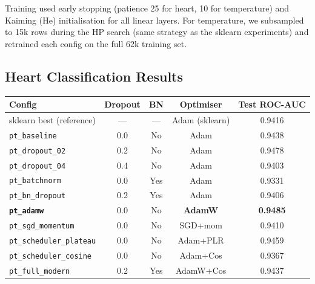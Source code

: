 \documentclass[11pt,a4paper]{article}
\begin{document}
Training used early stopping (patience 25 for heart, 10 for temperature) and Kaiming (He) initialisation for all linear layers.
For temperature, we subsampled to 15k rows during the HP search (same strategy as the sklearn experiments) and retrained each config on the full 62k training set.

\subsection{Heart Classification Results}

\begin{center}
\small
\begin{tabular}{lcccc}
\toprule
\textbf{Config} & \textbf{Dropout} & \textbf{BN} & \textbf{Optimiser} & \textbf{Test ROC-AUC} \\
\midrule
sklearn best (reference)           & ---  & ---  & Adam (sklearn) & 0.9416 \\
\midrule
\texttt{pt\_baseline}          & 0.0  & No  & Adam           & 0.9438 \\
\texttt{pt\_dropout\_02}       & 0.2  & No  & Adam           & 0.9478 \\
\texttt{pt\_dropout\_04}       & 0.4  & No  & Adam           & 0.9403 \\
\texttt{pt\_batchnorm}         & 0.0  & Yes & Adam           & 0.9331 \\
\texttt{pt\_bn\_dropout}       & 0.2  & Yes & Adam           & 0.9406 \\
\textbf{\texttt{pt\_adamw}}    & 0.0  & No  & \textbf{AdamW} & \textbf{0.9485} \\
\texttt{pt\_sgd\_momentum}     & 0.0  & No  & SGD+mom        & 0.9410 \\
\texttt{pt\_scheduler\_plateau}& 0.0  & No  & Adam+PLR       & 0.9459 \\
\texttt{pt\_scheduler\_cosine} & 0.0  & No  & Adam+Cos       & 0.9367 \\
\texttt{pt\_full\_modern}      & 0.2  & Yes & AdamW+Cos      & 0.9437 \\
\bottomrule
\end{tabular}
\end{center}

\begin{center}
\end{center}
\end{document}
